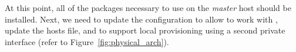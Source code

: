 At this point, all of the packages necessary to use \Warewulf{} on the {\em
master} host should be installed. Next, we need to update the configuration 
to allow \Warewulf{} to work with \baseOS{}, update the hosts file, and to
support local provisioning using a second private interface (refer to
Figure~\ref{fig:physical_arch}).
